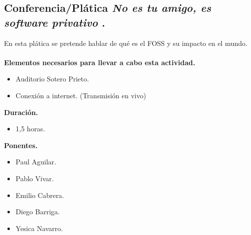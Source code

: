 \documentclass[a4paper,11pt]{article}                 %
\begin{document}
    \vspace{1 cm}
  

  
      \subsection{Conferencia/Plática  \textit{No es tu amigo, es software privativo} .}                                     %

   En esta plática se pretende hablar de qué es el FOSS y su impacto en el mundo. 
      \paragraph{}
  \textbf{Elementos necesarios para llevar a cabo esta actividad.}
  \begin{itemize}
    \label{list:sl}
    \item Auditorio Sotero Prieto.
        \item Conexión a internet. (Transmisión en vivo)
  \end{itemize}
  
  \textbf{Duración.}
  \begin{itemize}
    \item 1,5 horas.
  \end{itemize}
  
            \textbf{Ponentes.}
  \begin{itemize}
    \item Paul Aguilar.
    \item Pablo Vivar.
    \item Emilio Cabrera.
    \item Diego Barriga.
    \item Yesica Navarro.
  \end{itemize}
  
  \thispagestyle{empty}
    \newpage                                            %
\end{document}
